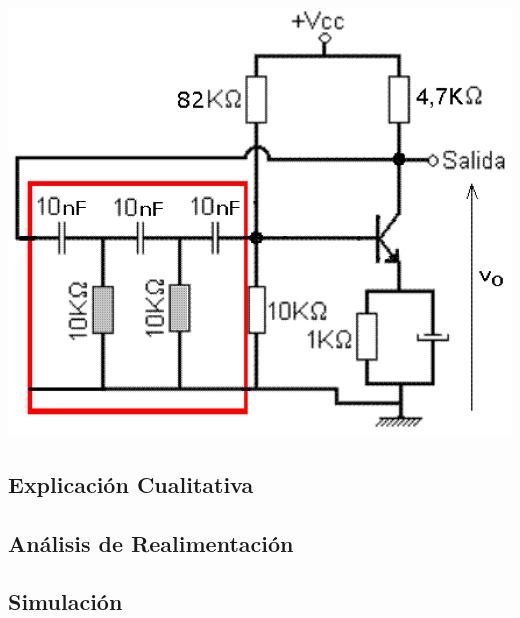 \begin{multicols}{2}
        \begin{center}
                   \includegraphics[width=\columnwidth]{oscilador1.png}
                   \label{fig:oscilador}
        \end{center}

        \subsection{Explicación Cualitativa}

        \subsection{Análisis de Realimentación}

        \subsection{Simulación}


\end{multicols}
